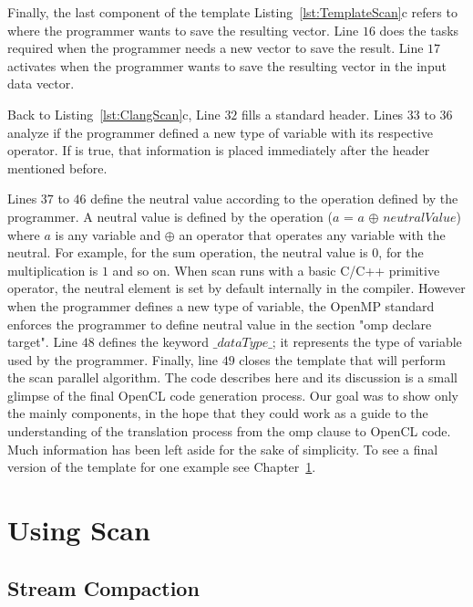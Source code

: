 \documentclass[Ingles]{ic-tese-v1}
\newcommand{\rcap}[1]{Chapter~\ref{cap:#1}}
\newcommand{\rlst}[1]{Listing~\ref{lst:#1}}
\begin{document}
Finally, the last component of the template \rlst{TemplateScan}{c} refers to
where the programmer wants to save the resulting vector. Line $16$ does the  tasks
required  when the programmer needs a new vector to save the result. Line $17$ activates when
the programmer wants to save the resulting vector in the input data vector.

Back to \rlst{ClangScan}{c}, Line $32$ fills a standard header. Lines $33$
to $36$ analyze if the programmer defined a new type of variable with its
respective operator. If is true, that information is placed immediately after
the header mentioned before.

Lines $37$ to $46$ define the neutral value according to the operation defined
by the programmer.  A neutral value is defined by the operation ($a$ = $a$
$\oplus$ $neutralValue$) where $a$ is any variable and $\oplus$ an operator
that operates any variable with the neutral. For example, for the sum
operation, the neutral value is $0$, for the multiplication is $1$ and so on.
When scan runs  with a basic C/C++ primitive  operator, the neutral  element is set
by default internally in the compiler. However when
the programmer defines a new type of variable, the OpenMP standard enforces
the programmer  to define neutral value in the section "omp declare target".
Line $48$ defines the keyword $\_dataType\_$; it represents the type of
variable used by the programmer. Finally, line $49$ closes the template that
will perform the scan parallel algorithm. The code describes here and its
discussion is a small glimpse of the final OpenCL code generation process. Our
goal was to show only the mainly components, in the hope that they could work
as a guide to the understanding of the translation process from the omp clause
to OpenCL code. Much information has been left aside for the sake of
simplicity.
To see a final version of the template for one example see \rcap{ScanUse}.

\chapter{Using Scan}
\label{cap:ScanUse}

\section{Stream Compaction}
\end{document}
